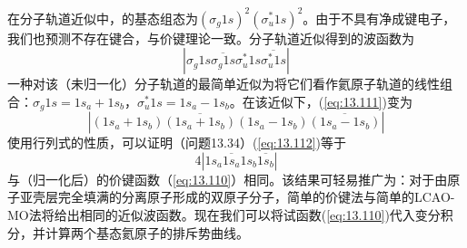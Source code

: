     在分子轨道近似中，的基态组态为$\left(\sigma_g1s\right)^2\left(\sigma_u^*1s\right)^2$。由于不具有净成键电子，我们也预测不存在键合，与价键理论一致。分子轨道近似得到的波函数为
    \begin{equation}
        \left| \sigma_g 1s \overline{\sigma_g 1s} \sigma_u^* 1s \overline{\sigma_u^* 1s} \right|
        \label{eq:13.111}
    \end{equation}
    一种对该（未归一化）分子轨道的最简单近似为将它们看作氦原子轨道的线性组合：$\sigma_g1s = 1s_a + 1s_b$，$\sigma_u^*1s = 1s_a - 1s_b$。在该近似下，(\ref{eq:13.111})变为
    \begin{equation}
        \left|\left(1s_{a}+1s_{b}\right) \overline{\left(1s_{a}+1s_{b}\right)}\left(1s_{a}-1s_{b}\right) \overline{\left(1s_{a}-1s_{b}\right)}\right|
        \label{eq:13.112}
    \end{equation}
    使用行列式的性质，可以证明（问题13.34）(\ref{eq:13.112})等于
    \begin{equation}
        4\left|1s_a\overline{1s_a}1s_b\overline{1s_b}\right|
        \label{eq:13.113}
    \end{equation}
    与（归一化后）的价键函数（\ref{eq:13.110}）相同。该结果可轻易推广为：对于由原子亚壳层完全填满的分离原子形成的双原子分子，简单的价键法与简单的LCAO-MO法将给出相同的近似波函数。现在我们可以将试函数(\ref{eq:13.110})代入变分积分，并计算两个基态氦原子的排斥势曲线。

